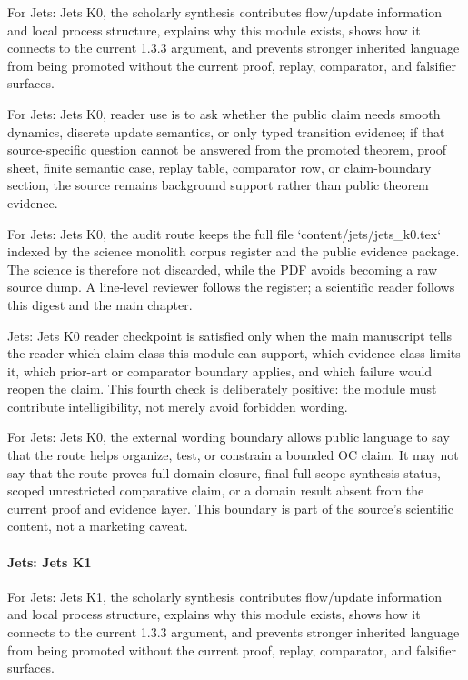 For Jets: Jets K0, the scholarly synthesis contributes flow/update information and local process structure, explains why this module exists, shows how it connects to the current 1.3.3 argument, and prevents stronger inherited language from being promoted without the current proof, replay, comparator, and falsifier surfaces.


For Jets: Jets K0, reader use is to ask whether the public claim needs smooth dynamics, discrete update semantics, or only typed transition evidence; if that source-specific question cannot be answered from the promoted theorem, proof sheet, finite semantic case, replay table, comparator row, or claim-boundary section, the source remains background support rather than public theorem evidence.


For Jets: Jets K0, the audit route keeps the full file `content/jets/jets\_k0.tex` indexed by the science monolith corpus register and the public evidence package. The science is therefore not discarded, while the PDF avoids becoming a raw source dump. A line-level reviewer follows the register; a scientific reader follows this digest and the main chapter.


Jets: Jets K0 reader checkpoint is satisfied only when the main manuscript tells the reader which claim class this module can support, which evidence class limits it, which prior-art or comparator boundary applies, and which failure would reopen the claim. This fourth check is deliberately positive: the module must contribute intelligibility, not merely avoid forbidden wording.


For Jets: Jets K0, the external wording boundary allows public language to say that the route helps organize, test, or constrain a bounded OC claim. It may not say that the route proves full-domain closure, final full-scope synthesis status, scoped unrestricted comparative claim, or a domain result absent from the current proof and evidence layer. This boundary is part of the source's scientific content, not a marketing caveat.


\paragraph{Jets: Jets K1}

For Jets: Jets K1, the scholarly synthesis contributes flow/update information and local process structure, explains why this module exists, shows how it connects to the current 1.3.3 argument, and prevents stronger inherited language from being promoted without the current proof, replay, comparator, and falsifier surfaces.


